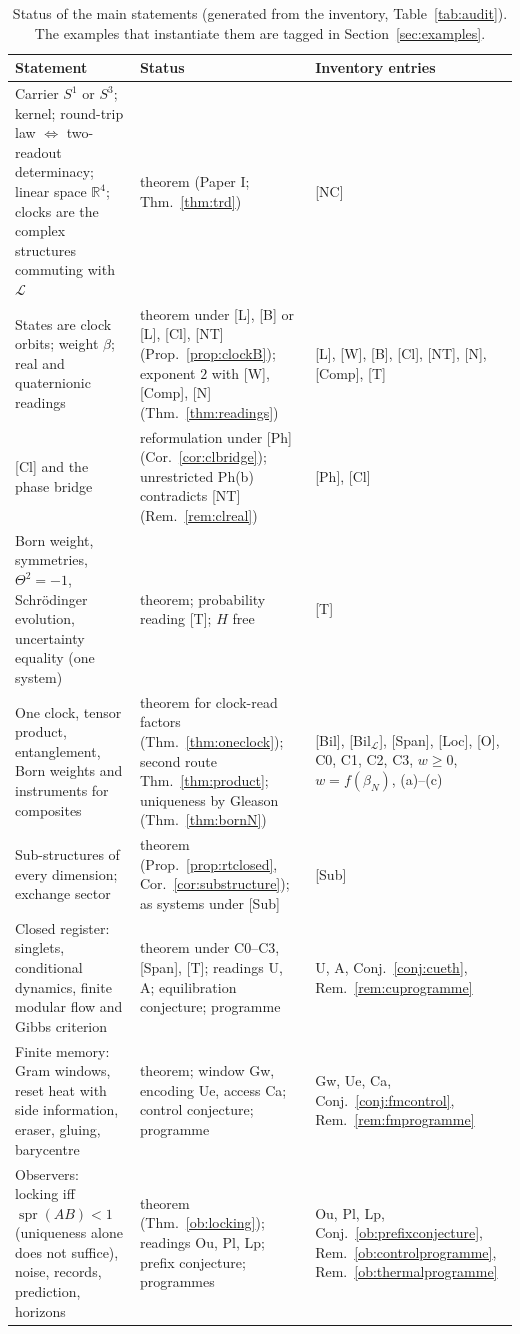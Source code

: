 \documentclass[aps,pra,onecolumn,superscriptaddress,nofootinbib,10pt]{revtex4-2}
\theoremstyle{definition}
\theoremstyle{remark}
\newcommand{\R}{\mathbb{R}}
\newcommand{\cL}{\mathcal{L}}
\begin{document}
\begin{table}[p]
\caption{Status of the main statements (generated from the inventory, Table~\ref{tab:audit}).  The examples that instantiate them are tagged in Section~\ref{sec:examples}.}
\label{tab:scope}
\footnotesize
\begin{tabular}{@{}p{}p{}p{}@{}}
\toprule
Statement & Status & Inventory entries\\
\midrule
{Carrier $S^1$ or $S^3$; kernel; round-trip law $\Leftrightarrow$ two-readout determinacy; linear space $\R^4$; clocks are the complex structures commuting with $\cL$} & theorem (Paper I; Thm.~\ref{thm:trd}) & [NC]\\
{States are clock orbits; weight $\beta$; real and quaternionic readings} & theorem under [L], [B] or [L], [Cl], [NT] (Prop.~\ref{prop:clockB}); exponent $2$ with [W], [Comp], [N] (Thm.~\ref{thm:readings}) & [L], [W], [B], [Cl], [NT], [N], [Comp], [T]\\
{[Cl] and the phase bridge} & reformulation under [Ph] (Cor.~\ref{cor:clbridge}); unrestricted Ph(b) contradicts [NT] (Rem.~\ref{rem:clreal}) & [Ph], [Cl]\\
{Born weight, symmetries, $\Theta^2=-1$, Schr\"odinger evolution, uncertainty equality (one system)} & theorem; probability reading [T]; $H$ free & [T]\\
{One clock, tensor product, entanglement, Born weights and instruments for composites} & theorem for clock-read factors (Thm.~\ref{thm:oneclock}); second route Thm.~\ref{thm:product}; uniqueness by Gleason (Thm.~\ref{thm:bornN}) & [Bil], [Bil$_\cL$], [Span], [Loc], [O], C0, C1, C2, C3, $w\ge0$, $w=f(\beta_N)$, (a)--(c)\\
{Sub-structures of every dimension; exchange sector} & theorem (Prop.~\ref{prop:rtclosed}, Cor.~\ref{cor:substructure}); as systems under [Sub] & [Sub]\\
{Closed register: singlets, conditional dynamics, finite modular flow and Gibbs criterion} & theorem under C0--C3, [Span], [T]; readings U, A; equilibration conjecture; programme & U, A, Conj.~\ref{conj:cueth}, Rem.~\ref{rem:cuprogramme}\\
{Finite memory: Gram windows, reset heat with side information, eraser, gluing, barycentre} & theorem; window Gw, encoding Ue, access Ca; control conjecture; programme & Gw, Ue, Ca, Conj.~\ref{conj:fmcontrol}, Rem.~\ref{rem:fmprogramme}\\
{Observers: locking iff $\operatorname{spr}(AB)<1$ (uniqueness alone does not suffice), noise, records, prediction, horizons} & theorem (Thm.~\ref{ob:locking}); readings Ou, Pl, Lp; prefix conjecture; programmes & Ou, Pl, Lp, Conj.~\ref{ob:prefixconjecture}, Rem.~\ref{ob:controlprogramme}, Rem.~\ref{ob:thermalprogramme}\\

\end{tabular}
\end{table}
\end{document}
